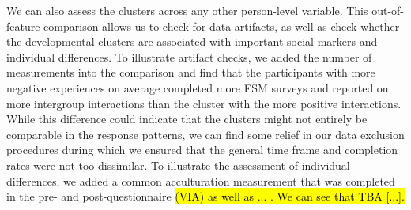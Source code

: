 
We can also assess the clusters across any other person-level variable.
This out-of-feature comparison allows us to check for data artifacts, as
well as check whether the developmental clusters are associated with
important social markers and individual differences. To illustrate
artifact checks, we added the number of measurements into the comparison
and find that the participants with more negative experiences on average
completed more ESM surveys and reported on more intergroup interactions
than the cluster with the more positive interactions. While this
difference could indicate that the clusters might not entirely be
comparable in the response patterns, we can find some relief in our data
exclusion procedures during which we ensured that the general time frame
and completion rates were not too dissimilar. To illustrate the
assessment of individual differences, we added a common acculturation
measurement that was completed in the pre- and post-questionnaire
\hl{(VIA) as well as ... . We can see that TBA [...].}
